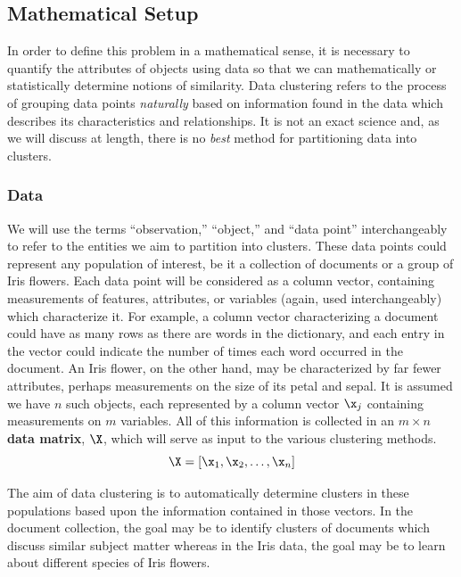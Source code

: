 \documentclass[
]{article}
\theoremstyle{definition}
\theoremstyle{definition}
\theoremstyle{definition}
\theoremstyle{definition}
\theoremstyle{remark}
\begin{document}
\hypertarget{mathematical-setup}{%
\subsection{Mathematical Setup}\label{mathematical-setup}}

In order to define this problem in a mathematical sense, it is necessary to quantify the attributes of objects using data so that we can mathematically or statistically determine notions of similarity. Data clustering refers to the process of grouping data points \emph{naturally} based on information found in the data which describes its characteristics and relationships. It is not an exact science and, as we will discuss at length, there is no \emph{best} method for partitioning data into clusters.

\hypertarget{data}{%
\subsubsection{Data}\label{data}}

We will use the terms ``observation,'' ``object,'' and ``data point'' interchangeably to refer to the entities we aim to partition into clusters. These data points could represent any population of interest, be it a collection of documents or a group of Iris flowers. Each data point will be considered as a column vector, containing measurements of features, attributes, or variables (again, used interchangeably) which characterize it. For example, a column vector characterizing a document could have as many rows as there are words in the dictionary, and each entry in the vector could indicate the number of times each word occurred in the document. An Iris flower, on the other hand, may be characterized by far fewer attributes, perhaps measurements on the size of its petal and sepal. It is assumed we have \(n\) such objects, each represented by a column vector \(\x_j\) containing measurements on \(m\) variables. All of this information is collected in an \(m \times n\) \textbf{data matrix}, \(\X\), which will serve as input to the various clustering methods.
\[\X=[\x_1,\x_2,\dots,\x_n]\]

The aim of data clustering is to automatically determine clusters in these populations based upon the information contained in those vectors. In the document collection, the goal may be to identify clusters of documents which discuss similar subject matter whereas in the Iris data, the goal may be to learn about different species of Iris flowers.
\end{document}
